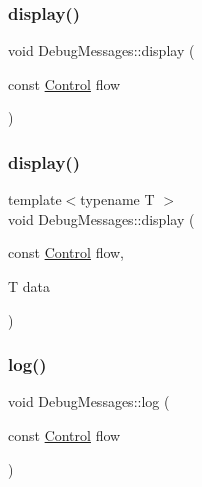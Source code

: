 \mbox{\label{class_debug_messages_a9a73bcf5d8298fd68b55a28c0878e852}} 
\subsubsection{\texorpdfstring{display()}{display()}\hspace{0.1cm}{\footnotesize\ttfamily [1/2]}}
{\footnotesize\ttfamily void Debug\+Messages\+::display (\begin{DoxyParamCaption}\item[{const \mbox{\hyperlink{_debug_messages_8h_a0da83e35f29c11f7f3c637234f2149f9}{Control}}}]{flow }\end{DoxyParamCaption})}

\mbox{\label{class_debug_messages_ae9e335acbae42f1c8c97e03d4d588a8f}} 
\subsubsection{\texorpdfstring{display()}{display()}\hspace{0.1cm}{\footnotesize\ttfamily [2/2]}}
{\footnotesize\ttfamily template$<$typename T $>$ \\
void Debug\+Messages\+::display (\begin{DoxyParamCaption}\item[{const \mbox{\hyperlink{_debug_messages_8h_a0da83e35f29c11f7f3c637234f2149f9}{Control}}}]{flow,  }\item[{T}]{data }\end{DoxyParamCaption})\hspace{0.3cm}{\ttfamily [inline]}}

\mbox{\label{class_debug_messages_a802f7d26dedc412f06bfe0957415bfd4}} 
\subsubsection{\texorpdfstring{log()}{log()}\hspace{0.1cm}{\footnotesize\ttfamily [1/2]}}
{\footnotesize\ttfamily void Debug\+Messages\+::log (\begin{DoxyParamCaption}\item[{const \mbox{\hyperlink{_debug_messages_8h_a0da83e35f29c11f7f3c637234f2149f9}{Control}}}]{flow }\end{DoxyParamCaption})}

